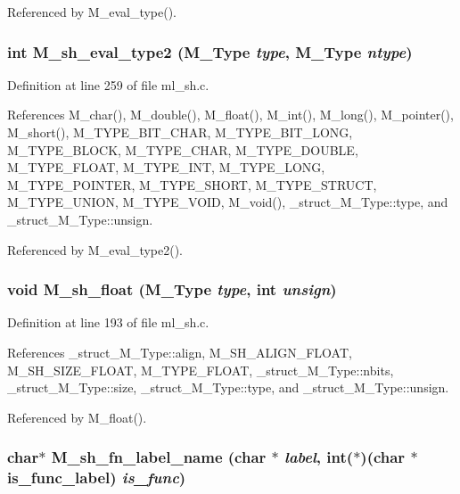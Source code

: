 Referenced by M\_\-eval\_\-type().
\subsubsection{\setlength{\rightskip}{0pt plus 5cm}int M\_\-sh\_\-eval\_\-type2 (\bf{M\_\-Type} {\em type}, \bf{M\_\-Type} {\em ntype})}\label{ml__sh_8c_c19e498e738a8bb5e303fd567644a243}




Definition at line 259 of file ml\_\-sh.c.

References M\_\-char(), M\_\-double(), M\_\-float(), M\_\-int(), M\_\-long(), M\_\-pointer(), M\_\-short(), M\_\-TYPE\_\-BIT\_\-CHAR, M\_\-TYPE\_\-BIT\_\-LONG, M\_\-TYPE\_\-BLOCK, M\_\-TYPE\_\-CHAR, M\_\-TYPE\_\-DOUBLE, M\_\-TYPE\_\-FLOAT, M\_\-TYPE\_\-INT, M\_\-TYPE\_\-LONG, M\_\-TYPE\_\-POINTER, M\_\-TYPE\_\-SHORT, M\_\-TYPE\_\-STRUCT, M\_\-TYPE\_\-UNION, M\_\-TYPE\_\-VOID, M\_\-void(), \_\-struct\_\-M\_\-Type::type, and \_\-struct\_\-M\_\-Type::unsign.

Referenced by M\_\-eval\_\-type2().
\subsubsection{\setlength{\rightskip}{0pt plus 5cm}void M\_\-sh\_\-float (\bf{M\_\-Type} {\em type}, int {\em unsign})}\label{ml__sh_8c_435788f46e0ae40e29fb2a08d0e5424b}




Definition at line 193 of file ml\_\-sh.c.

References \_\-struct\_\-M\_\-Type::align, M\_\-SH\_\-ALIGN\_\-FLOAT, M\_\-SH\_\-SIZE\_\-FLOAT, M\_\-TYPE\_\-FLOAT, \_\-struct\_\-M\_\-Type::nbits, \_\-struct\_\-M\_\-Type::size, \_\-struct\_\-M\_\-Type::type, and \_\-struct\_\-M\_\-Type::unsign.

Referenced by M\_\-float().
\subsubsection{\setlength{\rightskip}{0pt plus 5cm}char$\ast$ M\_\-sh\_\-fn\_\-label\_\-name (char $\ast$ {\em label}, int($\ast$)(char $\ast$is\_\-func\_\-label) {\em is\_\-func})}\label{ml__sh_8c_17526deefd8f7a8b2003447c631246c2}




